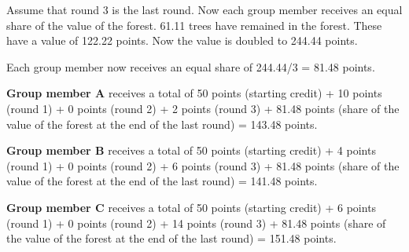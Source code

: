 \noindent Assume that round 3 is the last round. Now each group member receives an equal share of the value of the forest. 61.11 trees have remained in the forest. These have a value of 122.22 points. Now the value is doubled to 244.44 points.

\noindent Each group member now receives an equal share of 244.44/3 = 81.48 points.

\noindent \textbf{Group member A }receives a total of 50 points (starting credit) + 10 points (round 1) + 0 points (round 2) + 2 points (round 3) + 81.48 points (share of the value of the forest at the end of the last round) = 143.48 points.

\noindent \textbf{Group member B} receives a total of 50 points (starting credit) + 4 points (round 1) + 0 points (round 2) + 6 points (round 3) + 81.48 points (share of the value of the forest at the end of the last round) = 141.48 points.

\noindent \textbf{Group member C} receives a total of 50 points (starting credit) + 6 points (round 1) + 0 points (round 2) + 14 points (round 3) + 81.48 points (share of the value of the forest at the end of the last round) = 151.48 points.
